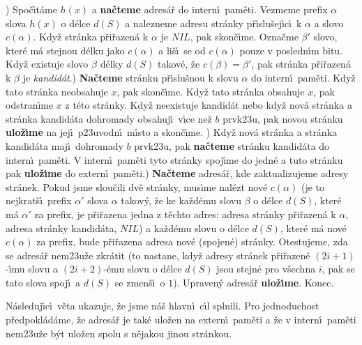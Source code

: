 \documentclass[a4paper,12pt]{article}
\begin{document}
) Spo\v c\'\i t\'ame $h(x)$ a {\bf na\v cteme} adres\'a\v r do intern\'\i\ pam\v eti. 
Vez\-me\-me prefix $\alpha$ slova $h(x)$ o d\'elce $d(S)$ a nalezneme 
adresu str\'anky p\v r\'\i slu\v sej\'\i c\'\i\ k $\alpha$ a slovo $
c(\alpha )$. 
Kdy\v z str\'anka p\v ri\v razen\'a k $\alpha$ je $NIL$, pak skon\v c\'\i me. 
Ozna\v cme $\beta'$ slovo, kter\'e m\'a stejnou d\'elku jako $c(\alpha 
)$ a 
li\v s\'\i\ se od $c(\alpha )$ pouze v posledn\'\i m bitu. Kdy\v z existuje 
slovo $\beta$ d\'elky $d(S)$ takov\'e, \v ze $c(\beta )=\beta'$, pak str\'anka 
p\v ri\v razen\'a k $\beta$ je \emph{kandid\'at}.) {\bf Na\v cteme} str\'anku p\v r\'\i slu\v snou k slovu $\alpha$ do intern\'\i\ 
pam\v eti. Kdy\v z tato str\'anka neobsahuje $x$, pak skon\v c\'\i me. 
Kdy\v z tato str\'anka obsahuje $x$, pak odstran\'\i me $x$ z t\'eto 
str\'anky. Kdy\v z neexistuje kandid\'at nebo kdy\v z nov\'a 
str\'anka a str\'anka kandid\'ata dohromady obsahuj\'\i\ v\'\i ce ne\v z $
b$ 
prvk\accent23u, pak novou str\'anku {\bf ulo\-\v z\'\i me} na jej\'\i\ 
p\accent23uvodn\'\i\ m\'\i sto a skon\v c\'\i me. \newline 
3) Kdy\v z nov\'a str\'anka a str\'anka kandid\'ata maj\'\i\ 
dohromady $b$ prvk\accent23u, pak {\bf na\v cteme} str\'anku 
kandid\'ata do intern\'\i\ pam\v eti. V intern\'\i\ pam\v eti tyto 
str\'anky spoj\'\i me do jedn\'e a tuto str\'anku pak 
{\bf ulo\-\v z\'\i me} do extern\'\i\ pam\v eti.\newline 
4) {\bf Na\v cteme} adres\'a\v r, kde zaktualizujeme adresy 
str\'anek. Po\-kud jsme slou\v cili dv\v e str\'anky, mus\'\i me nal\'ezt 
nov\'e $c(\alpha )$ (je to nejkrat\v s\'\i\ prefix $\alpha'$ slova $
\alpha$ takov\'y, \v ze 
ke ka\v zd\'emu slovu $\beta$ o d\'elce $d(S)$, kter\'e m\'a $\alpha'$ za prefix, 
je p\v ri\v razena jedna z t\v echto adres: adresa str\'anky 
p\v ri\v razen\'a k $\alpha$, adresa str\'anky kandid\'ata, $NIL$) a ka\v zd\'emu 
slovu o d\'elce $d(S)$, kter\'e m\'a nov\'e $c(\alpha )$ za prefix, bude 
p\v ri\v razena adresa nov\'e (spojen\'e) str\'anky. Otestujeme, zda 
se adres\'a\v r nem\accent23u\v ze zkr\'atit (to nastane, kdy\v z 
adresy str\'anek p\v ri\v razen\'e $(2i+1)$-\'\i mu slovu a $(2i+
2)$-\'emu 
slovu o d\'elce $d(S)$ jsou stejn\'e pro v\v sechna $i$, 
pak se tato slova spoj\'\i\ a $d(S)$ se zmen\v s\'\i\ o $1$). Upraven\'y 
adres\'a\v r {\bf ulo\v z\'\i me}. Konec.
\bigskip

\flushpar N\'asleduj\'\i c\'\i\ v\v eta ukazuje, \v ze jsme n\'a\v s hlavn\'\i\ c\'\i l splnili. Pro jednoduchost p\v redpokl\'ad\'ame, \v ze 
adres\'a\v r je tak\'e ulo\v zen na extern\'\i\ pam\v eti a \v ze v 
intern\'\i\ pam\v eti nem\accent23u\v ze b\'yt ulo\v zen spolu s n\v ejakou jinou str\'ankou. 
\end{document}
